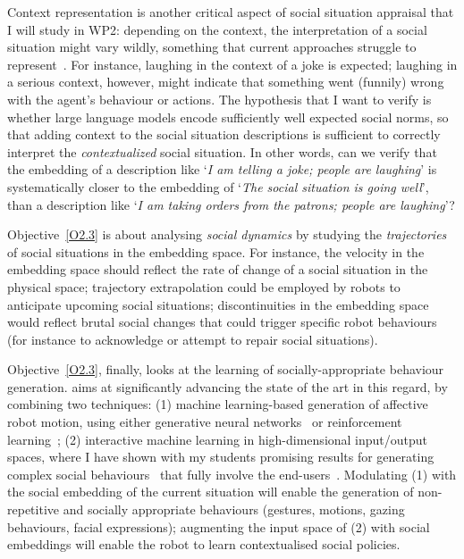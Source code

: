 Context representation is another critical aspect of social situation appraisal
that I will study in WP2: depending on the context, the interpretation of a
social situation might vary wildly, something that current approaches struggle
to represent~\cite{yang2018grand}. For instance, laughing in the context of a
joke is expected; laughing in a serious context, however, might indicate that
something went (funnily) wrong with the agent's behaviour or actions. The
hypothesis that I want to verify is whether large language models encode
sufficiently well expected social norms, so that adding context to the social
situation descriptions is sufficient to correctly interpret the
\emph{contextualized} social situation. In other words, can we verify that the
embedding of a description like `\emph{I am telling a joke; people are
laughing}' is systematically closer to the embedding of `\emph{The social
situation is going well}', than a description like `\emph{I am taking orders
from the patrons; people are laughing}'?

Objective~\ref{O2.3} is about analysing \emph{social dynamics} by
studying the \emph{trajectories} of social situations in the embedding space.
For instance, the velocity in the embedding space should reflect the rate of
change of a social situation in the physical space; trajectory extrapolation
could be employed by robots to anticipate upcoming social situations;
discontinuities in the embedding space would reflect brutal social changes that
could trigger specific robot behaviours (for instance to acknowledge or attempt
to repair social situations).

Objective~\ref{O2.3}, finally, looks at the learning of socially-appropriate
behaviour generation. \project aims at significantly advancing the state of the
art in this regard, by combining two techniques: (1) machine learning-based
generation of affective robot motion, using either generative neural
networks~\cite{marmpena2019generating,suguitan2020moveae} or reinforcement
learning~; (2) interactive machine learning in high-dimensional
input/output spaces, where I have shown with my students promising results for
generating complex social behaviours~\cite{senft2019teaching, winkle2020couch}
that fully involve the end-users~\cite{winkle2018social}. Modulating (1) with
the social embedding of the current situation will enable the generation of
non-repetitive and socially appropriate behaviours (gestures, motions, gazing
behaviours, facial expressions); augmenting the input space of (2) with social
embeddings will enable the robot to learn contextualised social policies.


